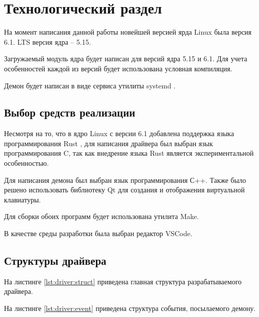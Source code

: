 \section{Технологический раздел}

На момент написания данной работы новейшей версией ярда Linux была версия 6.1. LTS версия ядра -- 5.15.

Загружаемый модуль ядра будет написан для версий ядра 5.15 и 6.1. Для учета особенностей каждой из версий будет использована условная компиляция.

Демон будет написан в виде сервиса утилиты systemd \cite{systemd}.

\subsection{Выбор средств реализации}

Несмотря на то, что в ядро Linux с версии 6.1 добавлена поддержка языка программирования Rust \cite{Rust}, для написания драйвера был выбран язык программирования C, так как внедрение языка Rust является экспериментальной особенностью.

Для написания демона был выбран язык программирования С++. Также было решено использовать библиотеку Qt для создания и отображения виртуальной клавиатуры.

Для сборки обоих программ будет использована утилита Make.

В качестве среды разработки была выбран редактор VSCode.

\subsection{Структуры драйвера}

На листинге \ref{lst:driver:struct} приведена главная структура разрабатываемого драйвера.


На листинге \ref{lst:driver:event} приведена структура события, посылаемого демону.


